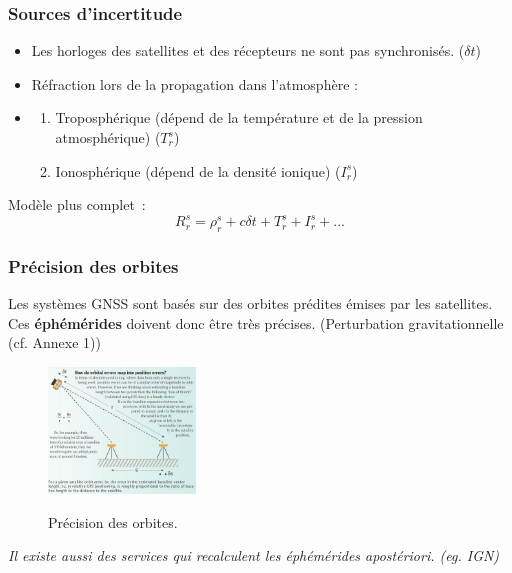\documentclass[xcolor=dvipsnames,envcountsect]{beamer}
\begin{document}
\begin{frame}
	\frametitle{Sources d'incertitude}
	\justifying
	\begin{itemize}
		\item Les horloges des satellites et des récepteurs ne sont pas synchronisés. ($\delta t$)
		\item Réfraction lors de la propagation dans l’atmosphère :
		\item \begin{enumerate}
			\item Troposphérique (dépend de la température et de la pression atmosphérique) ($T_r^s$)
			\item Ionosphérique (dépend de la densité ionique) ($I_r^s$)
		\end{enumerate}
	\end{itemize}
	Modèle plus complet :
	\begin{equation}
		\boxed{R_r^s = \rho_r^s + c\delta t + T_r^s + I_r^s + ...}
	\end{equation}
\end{frame}
\begin{frame}
	\frametitle{Précision des orbites}
	\justifying
	Les systèmes GNSS sont basés sur des orbites prédites émises par les satellites. \\
	Ces \textbf{éphémérides} doivent donc être très précises. {\small(Perturbation gravitationnelle (cf. Annexe 1))} \\
	\begin{figure}
		\centering
		\includegraphics[width=0.35\textwidth]{./Figures/ENS_gnss2.png} \\
		\caption {Précision des orbites. \cite{ens}}
	\end{figure}
	{\small	\textit{Il existe aussi des services qui recalculent les éphémérides apostériori. (eg. IGN)}}
\end{frame}
\end{document}
